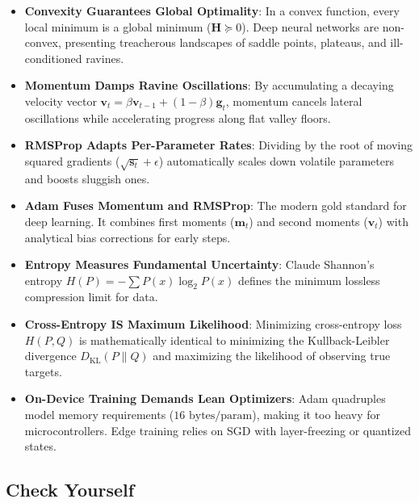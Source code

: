 \begin{takeaways}
\begin{itemize}
    \item \textbf{Convexity Guarantees Global Optimality}: In a convex function, every local minimum is a global minimum ($\mathbf{H} \succeq 0$). Deep neural networks are non-convex, presenting treacherous landscapes of saddle points, plateaus, and ill-conditioned ravines.
    \item \textbf{Momentum Damps Ravine Oscillations}: By accumulating a decaying velocity vector $\mathbf{v}_t = \beta \mathbf{v}_{t-1} + (1 - \beta)\mathbf{g}_t$, momentum cancels lateral oscillations while accelerating progress along flat valley floors.
    \item \textbf{RMSProp Adapts Per-Parameter Rates}: Dividing by the root of moving squared gradients ($\sqrt{\mathbf{s}_t} + \epsilon$) automatically scales down volatile parameters and boosts sluggish ones.
    \item \textbf{Adam Fuses Momentum and RMSProp}: The modern gold standard for deep learning. It combines first moments ($\mathbf{m}_t$) and second moments ($\mathbf{v}_t$) with analytical bias corrections for early steps.
    \item \textbf{Entropy Measures Fundamental Uncertainty}: Claude Shannon's entropy $H(P) = -\sum P(x) \log_2 P(x)$ defines the minimum lossless compression limit for data.
    \item \textbf{Cross-Entropy IS Maximum Likelihood}: Minimizing cross-entropy loss $H(P, Q)$ is mathematically identical to minimizing the Kullback-Leibler divergence $D_{\text{KL}}(P \parallel Q)$ and maximizing the likelihood of observing true targets.
    \item \textbf{On-Device Training Demands Lean Optimizers}: Adam quadruples model memory requirements ($16\text{ bytes/param}$), making it too heavy for microcontrollers. Edge training relies on SGD with layer-freezing or quantized states.
\end{itemize}
\end{takeaways}

\subsection{Check Yourself}\label{subsec:opt_check_yourself}

